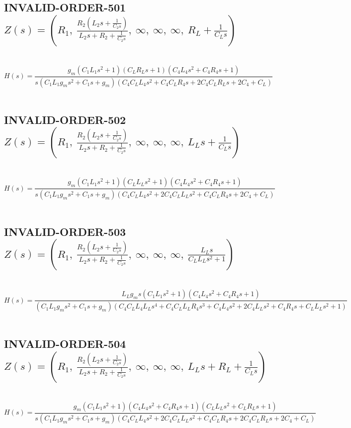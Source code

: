 \documentclass{article}
\begin{document}
\subsection{INVALID-ORDER-501 $Z(s) = \left( R_{1}, \  \frac{R_{2} \left(L_{2} s + \frac{1}{C_{2} s}\right)}{L_{2} s + R_{2} + \frac{1}{C_{2} s}}, \  \infty, \  \infty, \  \infty, \  R_{L} + \frac{1}{C_{L} s}\right)$ } \ 
\textbf{\[H(s) = \frac{g_{m} \left(C_{1} L_{1} s^{2} + 1\right) \left(C_{L} R_{L} s + 1\right) \left(C_{4} L_{4} s^{2} + C_{4} R_{4} s + 1\right)}{s \left(C_{1} L_{1} g_{m} s^{2} + C_{1} s + g_{m}\right) \left(C_{4} C_{L} L_{4} s^{2} + C_{4} C_{L} R_{4} s + 2 C_{4} C_{L} R_{L} s + 2 C_{4} + C_{L}\right)}\] } \ 
\subsection{INVALID-ORDER-502 $Z(s) = \left( R_{1}, \  \frac{R_{2} \left(L_{2} s + \frac{1}{C_{2} s}\right)}{L_{2} s + R_{2} + \frac{1}{C_{2} s}}, \  \infty, \  \infty, \  \infty, \  L_{L} s + \frac{1}{C_{L} s}\right)$ } \ 
\textbf{\[H(s) = \frac{g_{m} \left(C_{1} L_{1} s^{2} + 1\right) \left(C_{L} L_{L} s^{2} + 1\right) \left(C_{4} L_{4} s^{2} + C_{4} R_{4} s + 1\right)}{s \left(C_{1} L_{1} g_{m} s^{2} + C_{1} s + g_{m}\right) \left(C_{4} C_{L} L_{4} s^{2} + 2 C_{4} C_{L} L_{L} s^{2} + C_{4} C_{L} R_{4} s + 2 C_{4} + C_{L}\right)}\] } \ 
\subsection{INVALID-ORDER-503 $Z(s) = \left( R_{1}, \  \frac{R_{2} \left(L_{2} s + \frac{1}{C_{2} s}\right)}{L_{2} s + R_{2} + \frac{1}{C_{2} s}}, \  \infty, \  \infty, \  \infty, \  \frac{L_{L} s}{C_{L} L_{L} s^{2} + 1}\right)$ } \ 
\textbf{\[H(s) = \frac{L_{L} g_{m} s \left(C_{1} L_{1} s^{2} + 1\right) \left(C_{4} L_{4} s^{2} + C_{4} R_{4} s + 1\right)}{\left(C_{1} L_{1} g_{m} s^{2} + C_{1} s + g_{m}\right) \left(C_{4} C_{L} L_{4} L_{L} s^{4} + C_{4} C_{L} L_{L} R_{4} s^{3} + C_{4} L_{4} s^{2} + 2 C_{4} L_{L} s^{2} + C_{4} R_{4} s + C_{L} L_{L} s^{2} + 1\right)}\] } \ 
\subsection{INVALID-ORDER-504 $Z(s) = \left( R_{1}, \  \frac{R_{2} \left(L_{2} s + \frac{1}{C_{2} s}\right)}{L_{2} s + R_{2} + \frac{1}{C_{2} s}}, \  \infty, \  \infty, \  \infty, \  L_{L} s + R_{L} + \frac{1}{C_{L} s}\right)$ } \ 
\textbf{\[H(s) = \frac{g_{m} \left(C_{1} L_{1} s^{2} + 1\right) \left(C_{4} L_{4} s^{2} + C_{4} R_{4} s + 1\right) \left(C_{L} L_{L} s^{2} + C_{L} R_{L} s + 1\right)}{s \left(C_{1} L_{1} g_{m} s^{2} + C_{1} s + g_{m}\right) \left(C_{4} C_{L} L_{4} s^{2} + 2 C_{4} C_{L} L_{L} s^{2} + C_{4} C_{L} R_{4} s + 2 C_{4} C_{L} R_{L} s + 2 C_{4} + C_{L}\right)}\] } \ 
\end{document}

